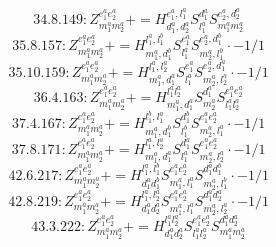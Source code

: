 \documentclass[letterpaper,10pt,fleqn,leqno,onecolumn]{article}
\begin{document}
\begin{equation} \;\;\;\;\;\;  34.8.149: Z^{e_{1}^{a}e_{2}^{a}}_{m_{1}^{a}m_{2}^{a}}+=H^{e_{1}^{a},l_{1}^{a}}_{d_{1}^{a},d_{2}^{a}}S^{d_{1}^{a}}_{l_{1}^{a}}S^{e_{2}^{a},d_{2}^{a}}_{m_{1}^{a}m_{2}^{a}} \end{equation}
\begin{equation} \;\;\;\;\;\;  35.8.157: Z^{e_{1}^{a}e_{2}^{a}}_{m_{1}^{a}m_{2}^{a}}+=H^{l_{1}^{a},l_{1}^{b}}_{m_{1}^{a},d_{1}^{b}}S^{e_{1}^{a}}_{l_{1}^{a}}S^{e_{2}^{a},d_{1}^{b}}_{m_{2}^{a},l_{1}^{b}}\cdot -1/1 \end{equation}
\begin{equation} \;\;\;\;\;\;  35.10.159: Z^{e_{1}^{a}e_{2}^{a}}_{m_{1}^{a}m_{2}^{a}}+=H^{l_{1}^{a},l_{2}^{a}}_{m_{1}^{a},d_{1}^{a}}S^{e_{1}^{a}}_{l_{1}^{a}}S^{e_{2}^{a},d_{1}^{a}}_{m_{2}^{a},l_{2}^{a}}\cdot -1/1 \end{equation}
\begin{equation} \;\;\;\;\;\;  36.4.163: Z^{e_{1}^{a}e_{2}^{a}}_{m_{1}^{a}m_{2}^{a}}+=H^{l_{1}^{a}l_{2}^{a}}_{m_{1}^{a},d_{1}^{a}}S^{d_{1}^{a}}_{m_{2}^{a}}S^{e_{1}^{a}e_{2}^{a}}_{l_{1}^{a}l_{2}^{a}} \end{equation}
\begin{equation} \;\;\;\;\;\;  37.4.167: Z^{e_{1}^{a}e_{2}^{a}}_{m_{1}^{a}m_{2}^{a}}+=H^{l_{1}^{b},l_{1}^{a}}_{m_{1}^{a},d_{1}^{b}}S^{d_{1}^{b}}_{l_{1}^{b}}S^{e_{1}^{a}e_{2}^{a}}_{m_{2}^{a},l_{1}^{a}}\cdot -1/1 \end{equation}
\begin{equation} \;\;\;\;\;\;  37.8.171: Z^{e_{1}^{a}e_{2}^{a}}_{m_{1}^{a}m_{2}^{a}}+=H^{l_{1}^{a},l_{2}^{a}}_{m_{1}^{a},d_{1}^{a}}S^{d_{1}^{a}}_{l_{1}^{a}}S^{e_{1}^{a}e_{2}^{a}}_{m_{2}^{a},l_{2}^{a}}\cdot -1/1 \end{equation}
\begin{equation} \;\;\;\;\;\;  42.6.217: Z^{e_{1}^{a}e_{2}^{a}}_{m_{1}^{a}m_{2}^{a}}+=H^{l_{1}^{a},l_{1}^{b}}_{d_{1}^{a}d_{1}^{b}}S^{e_{1}^{a}e_{2}^{a}}_{m_{1}^{a},l_{1}^{a}}S^{d_{1}^{a}d_{1}^{b}}_{m_{2}^{a},l_{1}^{b}}\cdot -1/1 \end{equation}
\begin{equation} \;\;\;\;\;\;  42.8.219: Z^{e_{1}^{a}e_{2}^{a}}_{m_{1}^{a}m_{2}^{a}}+=H^{l_{1}^{a},l_{2}^{a}}_{d_{1}^{a}d_{2}^{a}}S^{e_{1}^{a}e_{2}^{a}}_{m_{1}^{a},l_{1}^{a}}S^{d_{1}^{a}d_{2}^{a}}_{m_{2}^{a},l_{2}^{a}}\cdot -1/1 \end{equation}
\begin{equation} \;\;\;\;\;\;  43.3.222: Z^{e_{1}^{a}e_{2}^{a}}_{m_{1}^{a}m_{2}^{a}}+=H^{l_{1}^{a}l_{2}^{a}}_{d_{1}^{a}d_{2}^{a}}S^{e_{1}^{a}e_{2}^{a}}_{l_{1}^{a}l_{2}^{a}}S^{d_{1}^{a}d_{2}^{a}}_{m_{1}^{a}m_{2}^{a}} \end{equation}
\end{document}
